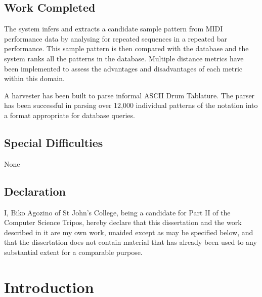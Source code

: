 \documentclass[12pt,twoside,notitlepage]{report}
\begin{document}
\section*{Work Completed}
The system infers and extracts a candidate sample pattern from MIDI performance data by analysing for repeated sequences in a repeated bar performance. This sample pattern is then compared with the database and the system ranks all the patterns in the database. Multiple distance metrics have been implemented to assess the advantages and disadvantages of each metric within this domain.

A harvester has been built to parse informal ASCII Drum Tablature. The parser has been successful in parsing over 12,000 individual patterns of the notation into a format appropriate for database queries.


\section*{Special Difficulties}

None
 
\newpage
\section*{Declaration}

I, Biko Agozino of St John's College, being a candidate for Part II of the Computer Science Tripos, hereby declare that this dissertation and the work described in it are my own work, unaided except as may be specified below, and that the dissertation does not contain material that has already been used to any substantial extent for a comparable purpose.

\bigskip
{}

\medskip
{}

\cleardoublepage

\tableofcontents


\newpage



\cleardoublepage        %

\setcounter{page}{1}
\pagestyle{headings}

\chapter{Introduction}
\end{document}
